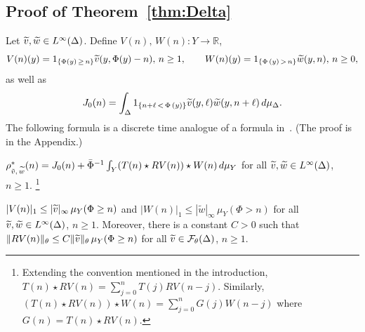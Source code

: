 \documentclass[10pt]{amsart}
\theoremstyle{definition}\newtheorem{defi}[theo]{Definition}\newtheorem{rema}[theo]{Remark}\newtheorem{exam}[theo]{Example}\newtheorem{exem}[theo]{Example}\newtheorem{nota}[theo]{Notation}
\newcommand{\R}{\mathbb{R}}
\newcommand{\cF}{\mathcal{F}}
\newcommand{\tw}{\widetilde{w}}
\newcommand{\tv}{\tilde{v}}
\let\oldtilde\tilde
\renewcommand*{\tilde}[1]{\mathchoice{\widetilde{#1}}{\widetilde{#1}}{\oldtilde{#1}}{\oldtilde{#1}}}
\begin{document}
\subsection{Proof of Theorem~\ref{thm:Delta}}\label{sec:X}



Let $\tv,\tw\in L^\infty(\Delta)$. Define $V(n),\,W(n):Y\to\R$,
\[
V(n)(y)=1_{\left\{\Phi(y)\,\ge\,n\right\}}\tv(y,\Phi(y)-n),\,n\ge1,
\qquad W(n)(y)= 1_{\left\{\Phi\,(y)\,>\,n\right\}}\tw(y,n), \, n\ge0,
\]
as well as
\[
J_0(n) =\int_\Delta 1_{\left\{n+\ell\,<\,\Phi\,(y)\right\}}\tv(y,\ell)\tw(y,n+\ell)\,d\mu_\Delta.
\]
The following formula is a discrete time analogue of a formula in~\cite{Pollicott85}. (The proof is in the Appendix.)

\begin{prop}\label{prop:conv}
$\rho^*_{\tv,\,\tw}(n)=J_0(n)+\bar\Phi^{-1}\int_Y (T(n)\star RV(n))\star W(n)\,d\mu_Y$ for all $\tv,\tw\in L^\infty(\Delta)$, $n\ge1$.
\footnote{Extending the convention mentioned in the introduction, $T(n)\star RV(n)=\sum_{j=0}^n T(j)RV(n-j)$. Similarly, $(T(n)\star RV(n))\star W(n)=\sum_{j=0}^n G(j)W(n-j)$ where $G(n)=T(n)\star RV(n)$.}
\end{prop}


\begin{prop}\label{prop:Vn}
$|V(n)|_1\le |\tv|_\infty\, \mu_Y(\Phi\ge n)$ and $|W(n)|_1\le |\tw|_\infty\, \mu_Y(\Phi>n)$ for all $\tv,\tw\in L^\infty(\Delta)$, $n\ge1$. Moreover, there is a constant $C>0$ such that $\|RV(n)\|_\theta\le C \|\tv\|_\theta\, \mu_Y(\Phi\ge n)$ for all $\tv\in\cF_\theta(\Delta)$, $n\ge1$.
\end{prop}
\end{document}
